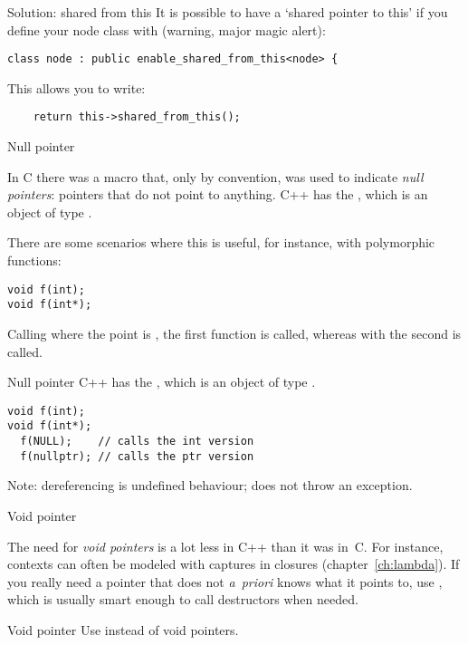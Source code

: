 \begin{slide}{Solution: shared from this}
  \label{sl:share-ptr-node-from}
  It is possible to have a `shared pointer to this' if you
  define your node class with (warning, major magic alert):
\begin{lstlisting}
class node : public enable_shared_from_this<node> {
\end{lstlisting}
This allows you to write:
\begin{lstlisting}
    return this->shared_from_this();
\end{lstlisting}
\end{slide}

 {Null pointer}

In C there was a macro  that, only by convention, was
used to indicate
\emph{null pointers}:
pointers that do not point to anything.
C++ has the , which is an object of type
.

There are some scenarios where this is useful, for instance, with
polymorphic functions:
\begin{lstlisting}
void f(int);
void f(int*);
\end{lstlisting}
Calling  where the point is , the first function is
called, whereas with  the second is called.

\begin{slide}{Null pointer}
  \label{sl:cpp-nullptr}
  C++ has the , which is an object of type
  .

\begin{lstlisting}
void f(int);
void f(int*);
  f(NULL);    // calls the int version
  f(nullptr); // calls the ptr version
\end{lstlisting}
Note: dereferencing is undefined behaviour; does not throw an exception.
\end{slide}

 {Void pointer}

The need for \emph{void pointers}
is a lot less in C++ than it was in~C. For
instance, contexts can often be modeled with captures in closures
(chapter~\ref{ch:lambda}). If you really need a pointer that does not
\textit{a~priori} knows what it points to, use ,
which is usually smart enough to call destructors when needed.

\begin{slide}{Void pointer}
  \label{sl:void-ptr}
  Use  instead of void pointers.
\end{slide}

